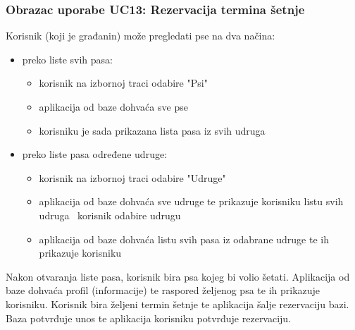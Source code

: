 			\newpage
	
	
			\subsubsection{Obrazac uporabe UC13: Rezervacija termina šetnje}
			
			Korisnik (koji je građanin) može pregledati pse na dva načina:
			\begin{itemize}
				\item preko liste svih pasa:
				\begin{itemize}
					\item korisnik na izbornoj traci odabire "Psi"
					\item aplikacija od baze dohvaća sve pse
					\item korisniku je sada prikazana lista pasa iz svih udruga
				\end{itemize}
				\item preko liste pasa određene udruge:
				\begin{itemize}
					\item korisnik na izbornoj traci odabire "Udruge"
					\item aplikacija od baze dohvaća sve udruge te prikazuje korisniku listu svih udruga
					\ korisnik odabire udrugu
					\item aplikacija od baze dohvaća listu svih pasa iz odabrane udruge te ih prikazuje korisniku
				\end{itemize}
			\end{itemize}
			Nakon otvaranja liste pasa, korisnik bira psa kojeg bi volio šetati. Aplikacija od baze dohvaća profil (informacije) te raspored željenog psa te ih prikazuje korisniku. Korisnik bira željeni termin šetnje te aplikacija šalje rezervaciju bazi. Baza potvrđuje unos te aplikacija korisniku potvrđuje rezervaciju.
			
